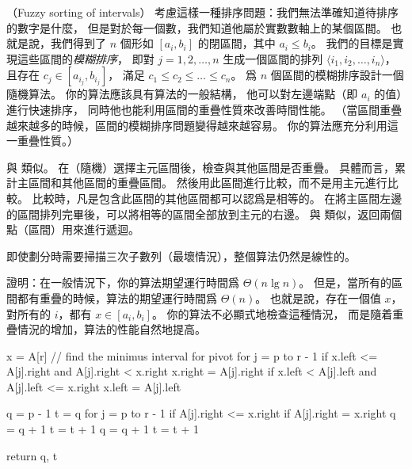 \startPROBLEM
（Fuzzy sorting of intervals）
考慮這樣一種排序問題：我們無法準確知道待排序的數字是什麼，
但是對於每一個數，我們知道他屬於實數數軸上的某個區間。
也就是說，我們得到了 $n$ 個形如 $[a_i,b_i]$ 的閉區間，其中 $a_i\le b_i$。
我們的目標是實現這些區間的\emph{模糊排序}，
即對 $j=1,2,\ldots,n$ 生成一個區間的排列 $\langle i_1,i_2,\ldots,i_n\rangle$，
且存在 $c_j \in [a_{i_j}, b_{i_j}]$，
滿足 $c_1\le c_2\le\ldots\le c_n$。
\startigBase[a]
\startitem
爲 $n$ 個區間的模糊排序設計一個隨機算法。
你的算法應該具有算法的一般結構，
他可以對左邊端點（即 $a_i$ 的值）進行快速排序，
同時他也能利用區間的重疊性質來改善時間性能。
（當區間重疊越來越多的時候，區間的模糊排序問題變得越來越容易。
你的算法應充分利用這一重疊性質。）
\stopitem

\startANSWER
與 類似。
在（隨機）選擇主元區間後，檢查與其他區間是否重疊。
具體而言，累計主區間和其他區間的重疊區間。
然後用此區間進行比較，而不是用主元進行比較。
比較時，凡是包含此區間的其他區間都可以認爲是相等的。
在將主區間左邊的區間排列完畢後，可以將相等的區間全部放到主元的右邊。
與 類似，返回兩個點（區間）用來進行遞迴。

即使劃分時需要掃描三次子數列（最壞情況），整個算法仍然是線性的。
\stopANSWER

\startitem
證明：在一般情況下，你的算法期望運行時間爲 $\Theta(n\lg{n})$。
但是，當所有的區間都有重疊的時候，算法的期望運行時間爲 $\Theta(n)$。
也就是說，存在一個值 $x$，對所有的 $i$，都有 $x\in [a_i,b_i]$。
你的算法不必顯式地檢查這種情況，
而是隨着重疊情況的增加，算法的性能自然地提高。
\stopitem

\startANSWER
{}
\startCLRSCODE
x = A[r]
// find the minimus interval for pivot
for j = p to r - 1
	if x.left <= A[j].right and A[j].right < x.right
		x.right = A[j].right
	if x.left < A[j].left and A[j].left <= x.right
		x.left = A[j].left

q = p - 1
t = q
for j = p to r - 1
	if A[j].right <= x.right
		if A[j].right = x.right
			q = q + 1
		t = t + 1
q = q + 1
t = t + 1

return q, t
\stopCLRSCODE
\stopANSWER
\stopigBase
\stopPROBLEM
